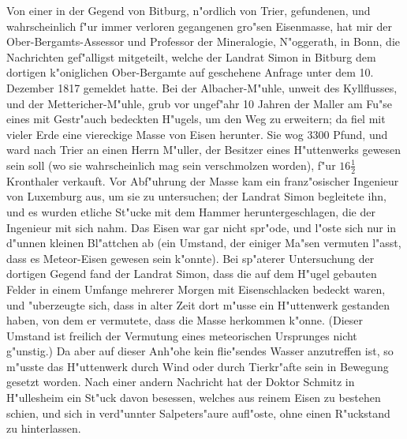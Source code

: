 \documentclass[a4paper, 11pt, oneside, polutonikogreek, german]{article}
\begin{document}
Von einer in der Gegend von Bitburg, n"ordlich von Trier, gefundenen, und wahrscheinlich f"ur immer verloren gegangenen gro"sen Eisenmasse, hat mir der Ober-Bergamts-Assessor und Professor der Mineralogie, N"oggerath, in Bonn, die Nachrichten gef"alligst mitgeteilt, welche der Landrat Simon in Bitburg dem dortigen k"oniglichen Ober-Bergamte auf geschehene Anfrage unter dem 10. Dezember 1817 gemeldet hatte. Bei der Albacher-M"uhle, unweit des Kyllflusses, und der Mettericher-M"uhle, grub vor ungef"ahr 10 Jahren der Maller am Fu"se eines mit Gestr"auch bedeckten H"ugels, um den Weg zu erweitern; da fiel mit vieler Erde eine viereckige Masse von Eisen herunter. Sie wog 3300 Pfund, und ward nach Trier an einen Herrn M"uller, der Besitzer eines H"uttenwerks gewesen sein soll (wo sie wahrscheinlich mag sein verschmolzen worden), f"ur $\mathfrak{16\frac{1}{2}}$ Kronthaler verkauft. Vor Abf"uhrung der Masse kam ein franz"osischer Ingenieur von Luxemburg aus, um sie zu untersuchen; der Landrat Simon begleitete ihn, und es wurden etliche St"ucke mit dem Hammer heruntergeschlagen, die der Ingenieur mit sich nahm. Das Eisen war gar nicht spr"ode, und l"oste sich nur in d"unnen kleinen Bl"attchen ab (ein Umstand, der einiger Ma"sen vermuten l"asst, dass es Meteor-Eisen gewesen sein k"onnte). Bei sp"aterer Untersuchung der dortigen Gegend fand der Landrat Simon, dass die auf dem H"ugel gebauten Felder in einem Umfange mehrerer Morgen mit Eisenschlacken bedeckt waren, und "uberzeugte sich, dass in alter Zeit dort m"usse ein H"uttenwerk gestanden haben, von dem er vermutete, dass die Masse herkommen k"onne. (Dieser Umstand ist freilich der Vermutung eines meteorischen Ursprunges nicht g"unstig.) Da aber auf dieser Anh"ohe kein flie"sendes Wasser anzutreffen ist, so m"usste das H"uttenwerk durch Wind oder durch Tierkr"afte sein in Bewegung gesetzt worden. Nach einer andern Nachricht hat der Doktor Schmitz in H"ullesheim ein St"uck davon besessen, welches aus reinem Eisen zu bestehen schien, und sich in verd"unnter Salpeters"aure aufl"oste, ohne einen R"uckstand zu hinterlassen.
\end{document}
